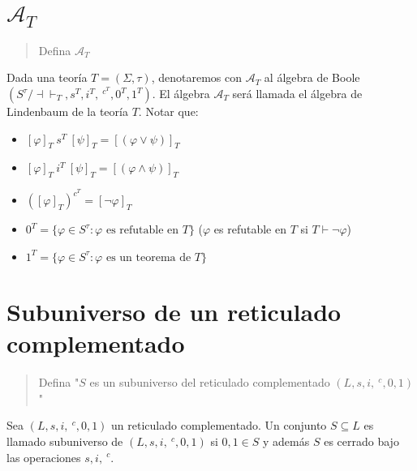 \documentclass{article}
\begin{document}
\section{$\mathcal{A}_T$}
\begin{quote}
  Defina $\mathcal{A}_T$
\end{quote}
Dada una teoría $T=(\Sigma,\tau)$, denotaremos con $\mathcal{A}_T$ al álgebra de Boole $(S^\tau/\dashv\vdash_T,s^T,i^T,\ ^{c^T},0^T,1^T)$. El álgebra $\mathcal{A}_T$ será llamada el álgebra de Lindenbaum de la teoría $T$.
\newline
Notar que:
\begin{itemize}
  \item $[\varphi]_T\ s^T\ [\psi]_T = [(\varphi\lor\psi)]_T$
  \item $[\varphi]_T\ i^T\ [\psi]_T = [(\varphi\land\psi)]_T$
  \item $([\varphi]_T)^{c^T}=[\neg\varphi]_T$
  \item $0^T=\{\varphi\in S^\tau:\varphi\text{ es refutable en }T\}$ ($\varphi$ es refutable en $T$ si $T\vdash\neg\varphi$)
  \item $1^T=\{\varphi\in S^\tau:\varphi\text{ es un teorema de }T\}$
\end{itemize}

\section{Subuniverso de un reticulado complementado}
\begin{quote}
  Defina "$S$ es un subuniverso del reticulado complementado $(L,s,i,\ ^c,0,1)$"
\end{quote}
Sea $(L,s,i,\ ^c,0,1)$ un reticulado complementado. Un conjunto $S\subseteq L$ es llamado subuniverso de $(L,s,i,\ ^c,0,1)$ si $0,1\in S$ y además $S$ es cerrado bajo las operaciones $s,i,\ ^c$.
\end{document}
